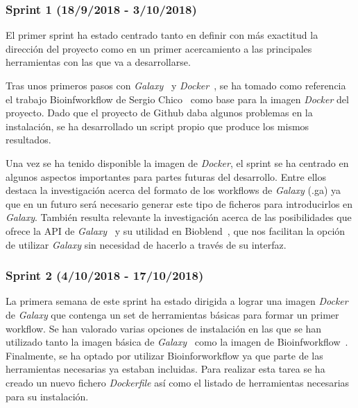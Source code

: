 \subsubsection{Sprint 1 (18/9/2018 - 3/10/2018)}
El primer sprint ha estado centrado tanto en definir con más exactitud la dirección del proyecto como en un primer acercamiento a las principales herramientas con las que va a desarrollarse. 

Tras unos primeros pasos con \textit{Galaxy}~\cite{Galaxy} y \textit{Docker}~\cite{Docker}, se ha tomado como referencia el trabajo Bioinfworkflow de Sergio Chico~\cite{Chico2018} como base para la imagen \textit{Docker} del proyecto. Dado que el proyecto de Github daba algunos problemas en la instalación, se ha desarrollado un script propio que produce los mismos resultados.

Una vez se ha tenido disponible la imagen de \textit{Docker}, el sprint se ha centrado en algunos aspectos importantes para partes futuras del desarrollo. Entre ellos destaca la investigación acerca del formato de los workflows de \textit{Galaxy} (.ga) ya que en un futuro será necesario generar este tipo de ficheros para introducirlos en \textit{Galaxy}. También resulta relevante la investigación acerca de las posibilidades que ofrece la API de \textit{Galaxy}~\cite{Galaxy} y su utilidad en Bioblend~\cite{GalaxyAPI}, que nos facilitan la opción de utilizar \textit{Galaxy} sin necesidad de hacerlo a través de su interfaz.

\subsubsection{Sprint 2 (4/10/2018 - 17/10/2018)}
La primera semana de este sprint ha estado dirigida a lograr una imagen \textit{Docker} de \textit{Galaxy} que contenga un set de herramientas básicas para formar un primer workflow. Se han valorado varias opciones de instalación en las que se han utilizado tanto la imagen básica de \textit{Galaxy}~\cite{GalaxyDocker} como la imagen de Bioinfworkflow~\cite{Chico2018}. Finalmente, se ha optado por utilizar Bioinforworkflow ya que parte de las herramientas necesarias ya estaban incluidas. 
Para realizar esta tarea se ha creado un nuevo fichero \textit{Dockerfile} así como el listado de herramientas necesarias para su instalación.


